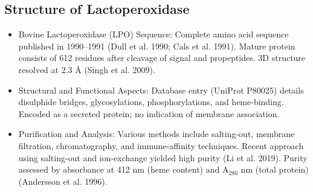 \subsection*{Structure of Lactoperoxidase}
\begin{itemize}
    \item Bovine Lactoperoxidase (LPO) Sequence:
    \subitem Complete amino acid sequence published in 1990–1991 (Dull et al. 1990; Cals et al. 1991).
    \subitem Mature protein consists of 612 residues after cleavage of signal and propeptides.
    \subitem 3D structure resolved at 2.3 Å (Singh et al. 2009).

    \item Structural and Functional Aspects:
    \subitem Database entry (UniProt P80025) details disulphide bridges, glycosylations, phosphorylations, and heme-binding.
    \subitem Encoded as a secreted protein; no indication of membrane association.

    \item Purification and Analysis:
    \subitem Various methods include salting-out, membrane filtration, chromatography, and immune-affinity techniques.
    \subitem Recent approach using salting-out and ion-exchange yielded high purity (Li et al. 2019).
    \subitem Purity assessed by absorbance at 412 nm (heme content) and A$_{280}$ nm (total protein) (Andersson et al. 1996).
\end{itemize}


